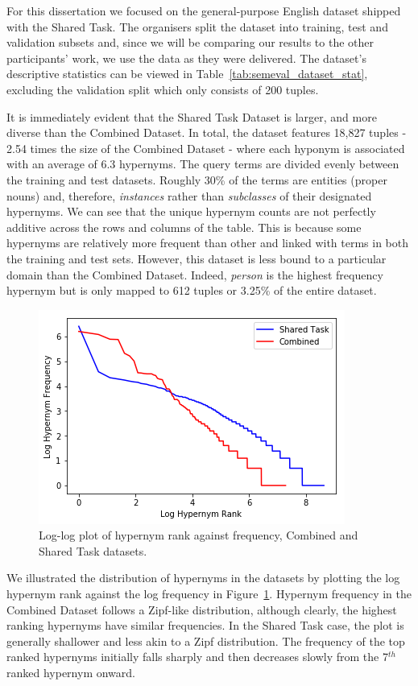 For this dissertation we focused on the general-purpose English dataset shipped with the Shared Task.  The organisers split the dataset into training, test and validation subsets and, since we will be comparing our results to the other participants' work, we use the data as they were delivered.  The dataset's descriptive statistics can be viewed in Table~\ref{tab:semeval_dataset_stat}, excluding the validation split which only consists of 200 tuples.

It is immediately evident that the Shared Task Dataset is larger, and more diverse than the Combined Dataset.  In total, the dataset features 18,827 tuples - 2.54 times the size of the Combined Dataset - where each hyponym is associated with an average of 6.3 hypernyms.  The query terms are divided evenly between the training and test datasets.  Roughly 30\% of the terms are entities (proper nouns) and, therefore, \textit{instances} rather than \textit{subclasses} of their designated hypernyms.  We can see that the unique hypernym counts are not perfectly additive across the rows and columns of the table.  This is because some hypernyms are relatively more frequent than other and linked with terms in both the training and test sets.  However, this dataset is less bound to a particular domain than the Combined Dataset.  Indeed, \textit{person} is the highest frequency hypernym but is only mapped to 612 tuples or 3.25\% of the entire dataset.
\begin{figure}[ht!] 
  \centering
  \includegraphics[width=0.5\linewidth]{images/both_hyper_freq_zipf.png}
  \caption{Log-log plot of hypernym rank against frequency, Combined and Shared Task datasets.}
  \label{fig:dataset_hypernym_freq}
\end{figure}
We illustrated the distribution of hypernyms in the datasets by plotting the log hypernym rank against the log frequency in Figure~\ref{fig:dataset_hypernym_freq}.  Hypernym frequency in the Combined Dataset follows a Zipf-like distribution, although clearly, the highest ranking hypernyms have similar frequencies.  In the Shared Task case,  the plot is generally shallower and less akin to a Zipf distribution.  The frequency of the top ranked hypernyms initially falls sharply and then decreases slowly from the 7$^{th}$ ranked hypernym onward.
